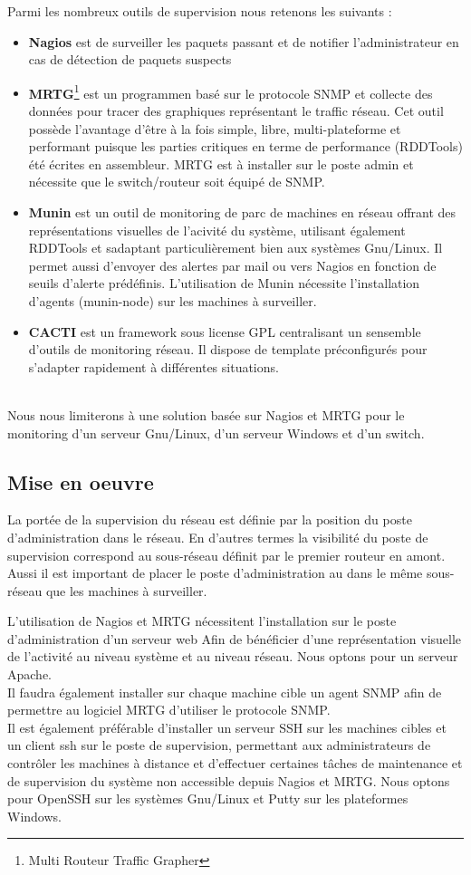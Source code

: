 \documentclass[a4paper]{article}
\begin{document}
Parmi les nombreux outils de supervision nous retenons les suivants :
\begin{itemize}
\item \textbf{Nagios} est de surveiller les paquets passant et de notifier l'administrateur en cas de détection de paquets suspects
\item \textbf{MRTG}\footnote{Multi Routeur Traffic Grapher} est un programmen basé sur le protocole SNMP et collecte des données pour tracer des graphiques représentant le traffic réseau. Cet outil possède l'avantage d'être à la fois simple, libre, multi-plateforme et performant puisque les parties critiques en terme de performance (RDDTools) été écrites en assembleur. MRTG est à installer sur le poste admin et nécessite que le switch/routeur soit équipé de SNMP.
\item \textbf{Munin} est un outil de monitoring de parc de machines en réseau offrant des représentations visuelles de l'acivité du système, utilisant également RDDTools et sadaptant particulièrement bien aux systèmes Gnu/Linux. Il permet aussi d'envoyer des alertes par mail ou vers Nagios en fonction de seuils d'alerte prédéfinis. L'utilisation de Munin nécessite l'installation d'agents (munin-node) sur les machines à surveiller.
\item \textbf{CACTI} est un framework sous license GPL centralisant un sensemble d'outils de monitoring réseau. Il dispose de template préconfigurés pour s'adapter rapidement à différentes situations.
\end{itemize}
~\\
Nous nous limiterons à une solution basée sur Nagios et MRTG pour le monitoring d'un serveur Gnu/Linux, d'un serveur Windows et d'un switch. 

\subsection{Mise en oeuvre}
La portée de la supervision du réseau est définie par la position du poste d'administration dans le réseau. En d'autres termes la visibilité du poste de supervision correspond au sous-réseau définit par le premier routeur en amont. Aussi il est important de placer le poste d'administration au dans le même sous-réseau que les machines à surveiller.

L'utilisation de Nagios et MRTG nécessitent l'installation sur le poste d'administration d'un serveur web Afin de bénéficier d'une représentation visuelle de l'activité au niveau système et au niveau réseau. Nous optons pour un serveur Apache.\\
Il faudra également installer sur chaque machine cible un agent SNMP afin de permettre au logiciel MRTG d'utiliser le protocole SNMP.\\
Il est également préférable d'installer un serveur SSH sur les machines cibles et un client ssh sur le poste de supervision, permettant aux administrateurs de contrôler les machines à distance et d'effectuer certaines tâches de maintenance et de supervision du système non accessible depuis Nagios et MRTG. 
Nous optons pour OpenSSH sur les systèmes Gnu/Linux et Putty sur les plateformes Windows. 
\end{document}
